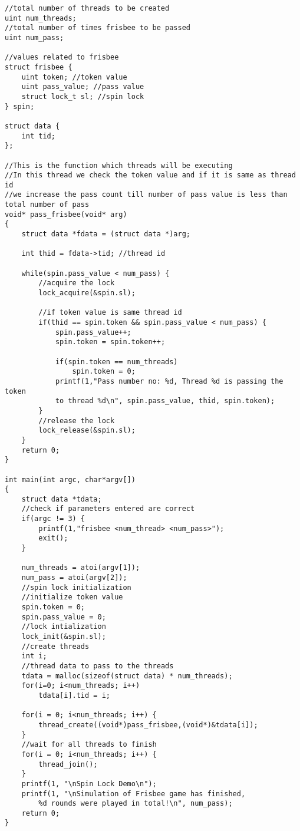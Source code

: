 \documentclass[a4paper, 11pt]{article}
\begin{document}
\begin{itemize}
\begin{lstlisting}
//total number of threads to be created
uint num_threads;
//total number of times frisbee to be passed
uint num_pass;

//values related to frisbee
struct frisbee {
    uint token;	//token value
    uint pass_value; //pass value
    struct lock_t sl; //spin lock
} spin;

struct data {
    int tid;
};

//This is the function which threads will be executing
//In this thread we check the token value and if it is same as thread id
//we increase the pass count till number of pass value is less than total number of pass
void* pass_frisbee(void* arg)
{
    struct data *fdata = (struct data *)arg;  

    int thid = fdata->tid; //thread id

    while(spin.pass_value < num_pass) {
        //acquire the lock
        lock_acquire(&spin.sl);
        
        //if token value is same thread id
        if(thid == spin.token && spin.pass_value < num_pass) {
            spin.pass_value++;
            spin.token = spin.token++;
            
            if(spin.token == num_threads)
                spin.token = 0;
            printf(1,"Pass number no: %d, Thread %d is passing the token 
            to thread %d\n", spin.pass_value, thid, spin.token);
        }
        //release the lock
        lock_release(&spin.sl);
    }
    return 0;
}

int main(int argc, char*argv[])
{
    struct data *tdata;
    //check if parameters entered are correct
    if(argc != 3) {
        printf(1,"frisbee <num_thread> <num_pass>");
        exit();
    }
    
    num_threads = atoi(argv[1]);
    num_pass = atoi(argv[2]);
    //spin lock initialization
    //initialize token value
    spin.token = 0;
    spin.pass_value = 0;
    //lock intialization
    lock_init(&spin.sl);
    //create threads
    int i;
    //thread data to pass to the threads
    tdata = malloc(sizeof(struct data) * num_threads);
    for(i=0; i<num_threads; i++)
        tdata[i].tid = i;

    for(i = 0; i<num_threads; i++) {
        thread_create((void*)pass_frisbee,(void*)&tdata[i]);
    }
    //wait for all threads to finish
    for(i = 0; i<num_threads; i++) {
        thread_join();
    }
    printf(1, "\nSpin Lock Demo\n");
    printf(1, "\nSimulation of Frisbee game has finished, 
	    %d rounds were played in total!\n", num_pass);
    return 0;
}


\end{lstlisting}
\end{itemize}
\end{document}
